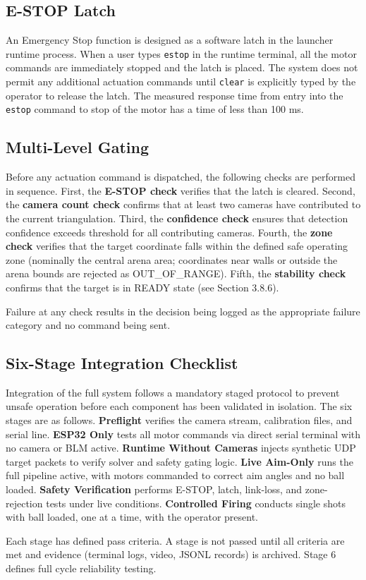 \subsection{E-STOP Latch}

An Emergency Stop function is designed as a software latch in the launcher runtime process. When a user types \texttt{estop} in the runtime terminal, all the motor commands are immediately stopped and the latch is placed. The system does not permit any additional actuation commands until \texttt{clear} is explicitly typed by the operator to release the latch. The measured response time from entry into the \texttt{estop} command to stop of the motor has a time of less than 100 ms.

\subsection{Multi-Level Gating}

Before any actuation command is dispatched, the following checks are performed in sequence. First, the \textbf{E-STOP check} verifies that the latch is cleared. Second, the \textbf{camera count check} confirms that at least two cameras have contributed to the current triangulation. Third, the \textbf{confidence check} ensures that detection confidence exceeds threshold for all contributing cameras. Fourth, the \textbf{zone check} verifies that the target coordinate falls within the defined safe operating zone (nominally the central arena area; coordinates near walls or outside the arena bounds are rejected as OUT\_OF\_RANGE). Fifth, the \textbf{stability check} confirms that the target is in READY state (see Section 3.8.6).

Failure at any check results in the decision being logged as the appropriate failure category and no command being sent.

\subsection{Six-Stage Integration Checklist}

Integration of the full system follows a mandatory staged protocol to prevent unsafe operation before each component has been validated in isolation. The six stages are as follows. \textbf{Preflight} verifies the camera stream, calibration files, and serial line. \textbf{ESP32 Only} tests all motor commands via direct serial terminal with no camera or BLM active. \textbf{Runtime Without Cameras} injects synthetic UDP target packets to verify solver and safety gating logic. \textbf{Live Aim-Only} runs the full pipeline active, with motors commanded to correct aim angles and no ball loaded. \textbf{Safety Verification} performs E-STOP, latch, link-loss, and zone-rejection tests under live conditions. \textbf{Controlled Firing} conducts single shots with ball loaded, one at a time, with the operator present.

Each stage has defined pass criteria. A stage is not passed until all criteria are met and evidence (terminal logs, video, JSONL records) is archived. Stage 6 defines full cycle reliability testing.
